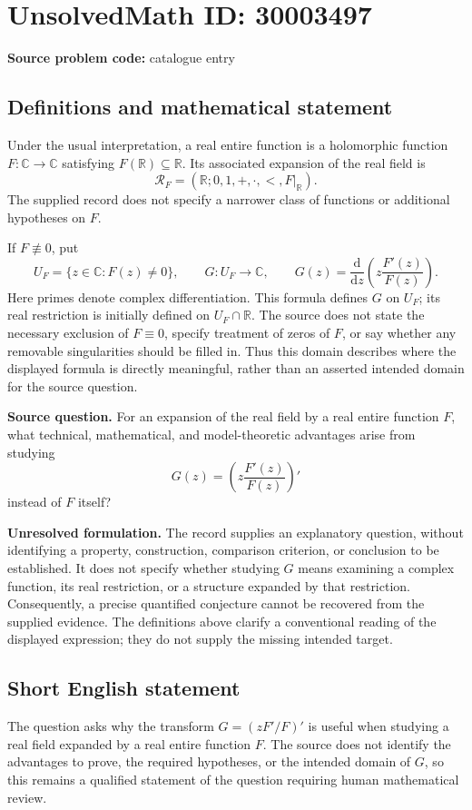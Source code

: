 \documentclass[11pt]{article}
\newcommand{\R}{\mathbb{R}}
\newcommand{\C}{\mathbb{C}}
\begin{document}
\section*{UnsolvedMath ID: 30003497}
\textbf{Source problem code:} catalogue entry
\subsection{Definitions and mathematical statement}
Under the usual interpretation, a real entire function is a holomorphic function \(F\colon\C\to\C\) satisfying \(F(\R)\subseteq\R\). Its associated expansion of the real field is
\[
\mathcal R_F=(\R;0,1,+,\cdot,<,F|_{\R}).
\]
The supplied record does not specify a narrower class of functions or additional hypotheses on \(F\).

If \(F\not\equiv0\), put
\[
U_F=\{z\in\C:F(z)\ne0\},\qquad
G\colon U_F\to\C,\qquad
G(z)=\frac{\mathrm d}{\mathrm dz}\left(z\frac{F'(z)}{F(z)}\right).
\]
Here primes denote complex differentiation. This formula defines \(G\) on \(U_F\); its real restriction is initially defined on \(U_F\cap\R\). The source does not state the necessary exclusion of \(F\equiv0\), specify treatment of zeros of \(F\), or say whether any removable singularities should be filled in. Thus this domain describes where the displayed formula is directly meaningful, rather than an asserted intended domain for the source question.

\textbf{Source question.} For an expansion of the real field by a real entire function \(F\), what technical, mathematical, and model-theoretic advantages arise from studying
\[
G(z)=\left(z\frac{F'(z)}{F(z)}\right)'
\]
instead of \(F\) itself?

\textbf{Unresolved formulation.} The record supplies an explanatory question, without identifying a property, construction, comparison criterion, or conclusion to be established. It does not specify whether studying \(G\) means examining a complex function, its real restriction, or a structure expanded by that restriction. Consequently, a precise quantified conjecture cannot be recovered from the supplied evidence. The definitions above clarify a conventional reading of the displayed expression; they do not supply the missing intended target.
\subsection{Short English statement}
The question asks why the transform \(G=(zF'/F)'\) is useful when studying a real field expanded by a real entire function \(F\). The source does not identify the advantages to prove, the required hypotheses, or the intended domain of \(G\), so this remains a qualified statement of the question requiring human mathematical review.
\end{document}
